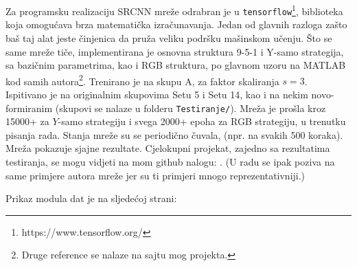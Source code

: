 \documentclass[12pt]{report}
\numberwithin{equation}{section}
\begin{document}
  Za programsku realizaciju SRCNN mreže odrabran je u \texttt{tensorflow}\footnote{https://www.tensorflow.org/}, biblioteka koja omogućava brza matematička izračunavanja. Jedan od glavnih razloga zašto baš taj alat jeste činjenica da pruža veliku podršku mašinskom učenju.
  Što se same mreže tiče, implementirana je osnovna struktura 9-5-1 i Y-samo strategija, sa bazičnim parametrima, kao i RGB struktura, po glavnom uzoru na MATLAB kod samih autora\footnote{Druge reference se nalaze na sajtu mog projekta.}. Trenirano je na skupu A, za faktor skaliranja $s=3$. Ispitivano je na originalnim skupovima Setu 5 i Setu 14, kao i na nekim novo-formiranim (skupovi se nalaze u folderu \texttt{Testiranje/}).  Mreža je prošla kroz 15000+ za $Y$-samo strategiju i svega 2000+ epoha za RGB strategiju, u trenutku pisanja rada. Stanja mreže su se periodično čuvala, (npr. na svakih 500 koraka). Mreža pokazuje sjajne rezultate. Cjelokupni projekat, zajedno sa rezultatima testiranja, se mogu vidjeti na mom github nalogu: \cite{samples}. (U radu se ipak poziva na same primjere autora mreže jer su ti primjeri mnogo reprezentativniji.)
 
 Prikaz modula dat je na sljedećoj strani:
  
\end{document}
